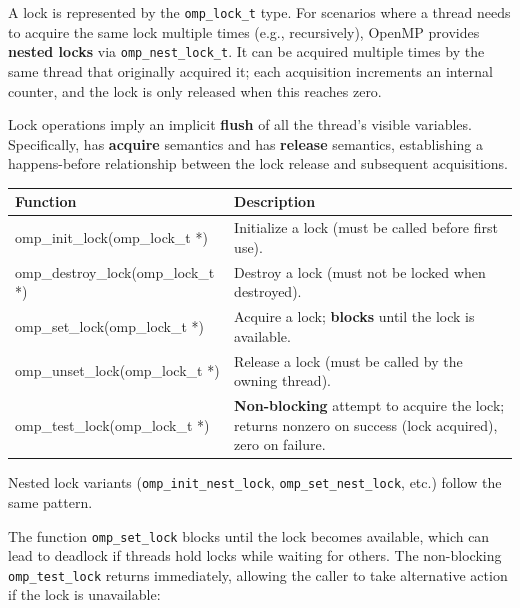 A lock is represented by the \texttt{omp\_lock\_t} type. For scenarios where a thread needs to acquire the same lock multiple times (e.g., recursively), OpenMP provides \textbf{nested locks} via \texttt{omp\_nest\_lock\_t}. It can be acquired multiple times by the same thread that originally acquired it; each acquisition increments an internal counter, and the lock is only released when this reaches zero.

\begin{warningblock}
Lock operations imply an implicit \textbf{flush} of all the thread's visible variables. Specifically,  has \textbf{acquire} semantics and  has \textbf{release} semantics, establishing a happens-before relationship between the lock release and subsequent acquisitions.
\end{warningblock}



\begin{center}
\small
\renewcommand{\arraystretch}{1.4}
\begin{tabular}{@{} >{\ttfamily\footnotesize}l p{} @{}}
\toprule
\textbf{Function} & \textbf{Description} \\
\midrule
omp\_init\_lock(omp\_lock\_t *) & Initialize a lock (must be called before first use). \\
omp\_destroy\_lock(omp\_lock\_t *) & Destroy a lock (must not be locked when destroyed). \\
omp\_set\_lock(omp\_lock\_t *) & Acquire a lock; \textbf{blocks} until the lock is available. \\
omp\_unset\_lock(omp\_lock\_t *) & Release a lock (must be called by the owning thread). \\
omp\_test\_lock(omp\_lock\_t *) & \textbf{Non-blocking} attempt to acquire the lock; returns nonzero on success (lock acquired), zero on failure. \\
\bottomrule
\end{tabular}
\end{center}

Nested lock variants (\texttt{omp\_init\_nest\_lock}, \texttt{omp\_set\_nest\_lock}, etc.) follow the same pattern.

The function \texttt{omp\_set\_lock} blocks until the lock becomes available, which can lead to deadlock if threads hold locks while waiting for others. The non-blocking \texttt{omp\_test\_lock} returns immediately, allowing the caller to take alternative action if the lock is unavailable:

